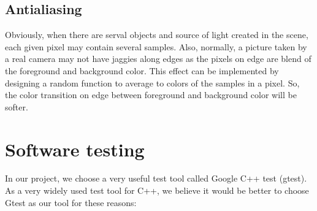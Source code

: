 \documentclass[11pt]{article}
\begin{document}
\subsection{Antialiasing}
Obviously, when there are serval objects and source of light created in the scene, each given pixel may contain several samples. Also, normally, a picture taken by a real camera may not have jaggies along edges as the pixels on edge are blend of the foreground and background color. This effect can be implemented by designing a random function to average to colors of the samples in a pixel. So, the color transition on edge between foreground and background color will be softer.

\section{Software testing}
In our project, we choose a very useful test tool called Google C++ test (gtest). As a very widely used test tool for C++, we believe it would be better to choose Gtest as our tool for these reasons:
\end{document}

